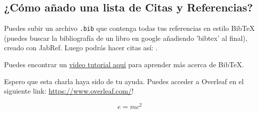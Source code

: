 \documentclass[a4paper]{article}
\begin{document}
\subsection{¿Cómo añado una lista de Citas y Referencias?}

Puedes subir un archivo \verb|.bib| que contenga todas tus referencias en estilo BibTeX (puedes buscar la bibliografía de un libro en google añadiendo 'bibtex' al final), creado con JabRef. Luego podrás hacer citas así: \cite{Griffiths:1492149}.

Puedes encontrar un \href{https://www.overleaf.com/help/97-how-to-include-a-bibliography-using-bibtex}{video tutorial aquí} para aprender más acerca de BibTeX.

Espero que esta charla haya sido de tu ayuda. Puedes acceder a Overleaf en el siguiente link: \url{https://www.overleaf.com/}!




\blindtext 

\begin{equation}
\label{eq:emc}
e = mc^2
\end{equation}

\blindtext
\end{document}
